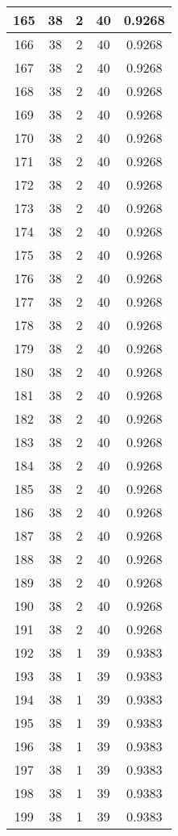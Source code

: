 \documentclass[letterpaper, 12pt]{article}
\begin{document}
\begin{longtable}{|c|c|c|c|c|}
\hline
165 & 38 & 2 & 40 & 0.9268 \\
\hline
166 & 38 & 2 & 40 & 0.9268 \\
\hline
167 & 38 & 2 & 40 & 0.9268 \\
\hline
168 & 38 & 2 & 40 & 0.9268 \\
\hline
169 & 38 & 2 & 40 & 0.9268 \\
\hline
170 & 38 & 2 & 40 & 0.9268 \\
\hline
171 & 38 & 2 & 40 & 0.9268 \\
\hline
172 & 38 & 2 & 40 & 0.9268 \\
\hline
173 & 38 & 2 & 40 & 0.9268 \\
\hline
174 & 38 & 2 & 40 & 0.9268 \\
\hline
175 & 38 & 2 & 40 & 0.9268 \\
\hline
176 & 38 & 2 & 40 & 0.9268 \\
\hline
177 & 38 & 2 & 40 & 0.9268 \\
\hline
178 & 38 & 2 & 40 & 0.9268 \\
\hline
179 & 38 & 2 & 40 & 0.9268 \\
\hline
180 & 38 & 2 & 40 & 0.9268 \\
\hline
181 & 38 & 2 & 40 & 0.9268 \\
\hline
182 & 38 & 2 & 40 & 0.9268 \\
\hline
183 & 38 & 2 & 40 & 0.9268 \\
\hline
184 & 38 & 2 & 40 & 0.9268 \\
\hline
185 & 38 & 2 & 40 & 0.9268 \\
\hline
186 & 38 & 2 & 40 & 0.9268 \\
\hline
187 & 38 & 2 & 40 & 0.9268 \\
\hline
188 & 38 & 2 & 40 & 0.9268 \\
\hline
189 & 38 & 2 & 40 & 0.9268 \\
\hline
190 & 38 & 2 & 40 & 0.9268 \\
\hline
191 & 38 & 2 & 40 & 0.9268 \\
\hline
192 & 38 & 1 & 39 & 0.9383 \\
\hline
193 & 38 & 1 & 39 & 0.9383 \\
\hline
194 & 38 & 1 & 39 & 0.9383 \\
\hline
195 & 38 & 1 & 39 & 0.9383 \\
\hline
196 & 38 & 1 & 39 & 0.9383 \\
\hline
197 & 38 & 1 & 39 & 0.9383 \\
\hline
198 & 38 & 1 & 39 & 0.9383 \\
\hline
199 & 38 & 1 & 39 & 0.9383 \\
\hline
\end{longtable}
\end{document}
